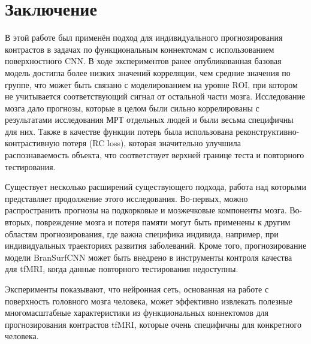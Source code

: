 \section{Заключение}

В этой работе был применён подход для индивидуального прогнозирования контрастов в задачах по функциональным коннектомам с использованием поверхностного CNN.
В ходе экспериментов ранее опубликованная базовая модель достигла более низких значений корреляции, чем средние значения по группе, что может быть связано с моделированием на уровне ROI, при котором не учитывается соответствующий сигнал от остальной части мозга.
Исследование мозга дало прогнозы, которые в целом были сильно коррелированы с результатами исследования МРТ отдельных людей и были весьма специфичны для них.
Также в качестве функции потерь была использована реконструктивно-контрастивную потеря (RC loss), которая значительно улучшила распознаваемость объекта, что соответствует верхней границе теста и повторного тестирования.

Существует несколько расширений существующего подхода, работа над которыми представляет продолжение этого исследования.
Во-первых, можно распространить прогнозы на подкорковые и мозжечковые компоненты мозга.
Во-вторых, повреждение мозга и потеря памяти могут быть применены к другим областям прогнозирования, где важна специфика индивида, например, при индивидуальных траекториях развития заболеваний.
Кроме того, прогнозирование модели BranSurfCNN может быть внедрено в инструменты контроля качества для tfMRI, когда данные повторного тестирования недоступны.

Эксперименты показывают, что нейронная сеть, основанная на работе с поверхность головного мозга человека, может эффективно извлекать полезные многомасштабные характеристики из функциональных коннектомов для прогнозирования контрастов tfMRI, которые очень специфичны для конкретного человека.
